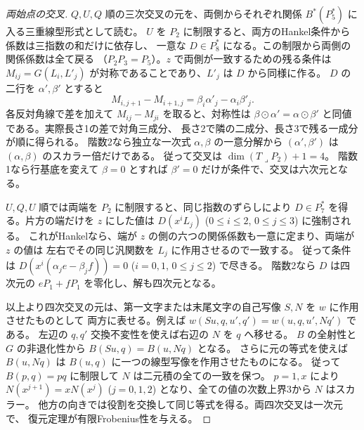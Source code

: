 \begin{proof}[両始点の交叉]
$Q,U,Q$ 順の三次交叉の元を、両側からそれぞれ関係 $B^*(P_5^*)$ に入る三重線型形式として読む。
$U$ を $P_2$ に制限すると、両方のHankel条件から係数は三指数の和だけに依存し、
一意な $D\in P_8^*$ になる。この制限から両側の関係係数は全て戻る
（$P_2P_3=P_5$）。$z$ で両側が一致するための残る条件は
$M_{ij}=G(L_i,L'_j)$ が対称であることであり、$L'_j$ は $D$ から同様に作る。
$D$ の二行を $\alpha',\beta'$ とすると
\[
 M_{i,j+1}-M_{i+1,j}=\beta_i\alpha'_j-\alpha_i\beta'_j.
\]
各反対角線で差を加えて $M_{ij}-M_{ji}$ を取ると、対称性は
$\beta\odot\alpha'=\alpha\odot\beta'$ と同値である。実際長さ1の差で対角三成分、
長さ2で隣の二成分、長さ3で残る一成分が順に得られる。
階数2なら独立な一次式 $\alpha,\beta$ の一意分解から
$(\alpha',\beta')$ は $(\alpha,\beta)$ のスカラー倍だけである。
従って交叉は $\dim(T\mathbin{\lrcorner}P_2)+1=4$。
階数1なら行基底を変えて $\beta=0$ とすれば $\beta'=0$ だけが条件で、交叉は六次元となる。

$U,Q,U$ 順では両端を $P_2$ に制限すると、同じ指数のずらしにより
$D\in P_7^*$ を得る。片方の端だけを $z$ にした値は
$D(x^i L_j)$ ($0\le i\le2$, $0\le j\le3$) に強制される。
これがHankelなら、端が $z$ の側の六つの関係係数も一意に定まり、両端が $z$ の値は
左右でその同じ汎関数を $L_j$ に作用させるので一致する。
従って条件は $D(x^i(\alpha_j e-\beta_j f))=0$ ($i=0,1$, $0\le j\le2$) で尽きる。
階数2なら $D$ は四次元の $eP_1+fP_1$ を零化し、解も四次元となる。

以上より四次交叉の元は、第一文字または末尾文字の自己写像 $S,N$ を $w$ に作用させたものとして
両方に表せる。例えば $w(Su,q,u',q')=w(u,q,u',Nq')$ である。
左辺の $q,q'$ 交換不変性を使えば右辺の $N$ を $q$ へ移せる。
$B$ の全射性と $G$ の非退化性から $B(Su,q)=B(u,Nq)$ となる。
さらに元の等式を使えば $B(u,Nq)$ は $B(u,q)$ に一つの線型写像を作用させたものになる。
従って $B(p,q)=pq$ に制限して $N$ は二元積の全ての一致を保つ。
$p=1,x$ により $N(x^{j+1})=xN(x^j)$ ($j=0,1,2$) となり、全ての値の次数上界3から $N$ はスカラー。
他方の向きでは役割を交換して同じ等式を得る。両四次交叉は一次元で、
復元定理が有限Frobenius性を与える。
\end{proof}
